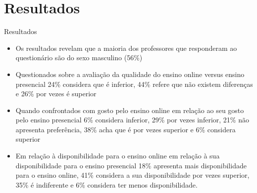 \documentclass[10pt]{beamer}
\begin{document}
\section{Resultados}
\begin{comment} 
\begin{frame}
	\frametitle{Determinação do número de clusters}
	\begin{figure}
		\texttt{[image: images/elbowAnalysis.png]}
		\caption{Representação para identificação visual do número de clusters}
		\label{figure1}
	\end{figure}
\end{frame}

\begin{frame}
	\frametitle{Representação dos dados 2D}
	\begin{figure}
		\texttt{[image: images/clusters2D.png]}
		\caption{Reduzimos a as variáveis a duas dimensões recorrendo ao \emph{Principal Components Analysis} para facilitar a representação}
		\label{figure2}
	\end{figure}
\end{frame}
\end{comment}

\begin{frame}[fragile]{Resultados}
  	\begin{itemize}
		\item Os resultados revelam que a maioria dos professores que responderam ao questionário são do sexo masculino (56\%)
		\item Questionados sobre a avaliação da qualidade do ensino online versus ensino presencial 24\% considera que é inferior, 44\% refere que não existem diferenças e 26\% por vezes é superior
		\item Quando confrontados com gosto pelo ensino online em relação ao seu gosto pelo ensino presencial 6\% considera inferior, 29\% por vezes inferior, 21\% não apresenta preferência, 38\% acha que é por vezes superior e 6\% considera superior
		\item Em relação à disponibilidade para o ensino online em relação à sua disponibilidade para o ensino presencial 18\% apresenta mais disponibilidade para o ensino online, 41\% considera a sua disponibilidade por vezes superior, 35\% é indiferente e 6\% considera ter menos disponibilidade.
	\end{itemize}
\end{frame}
\end{document}
